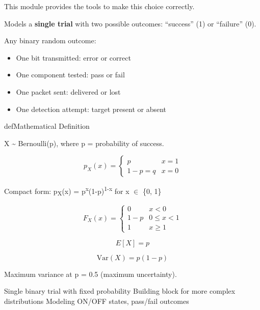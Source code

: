 This module provides the tools to make this choice correctly.



Models a \textbf{single trial} with two possible outcomes: ``success'' (1) or ``failure'' (0).


Any binary random outcome:

\begin{itemize}
\tightlist
\item
  One bit transmitted: error or correct
\item
  One component tested: pass or fail
\item
  One packet sent: delivered or lost
\item
  One detection attempt: target present or absent
\end{itemize}

\begin{PSbox}[unbreakable]{def}{Mathematical Definition}

X \textasciitilde{} Bernoulli(p), where p = probability of success.

\end{PSbox}


\[p_X(x) = \begin{cases} p & x = 1 \\ 1-p = q & x = 0 \end{cases}\]

Compact form: p\textsubscript{X}(x) = p\textsuperscript{x}(1-p)\textsuperscript{1-x} for x \ensuremath{\in} \{0, 1\}


\[F_X(x) = \begin{cases} 0 & x < 0 \\ 1-p & 0 \leq x < 1 \\ 1 & x \geq 1 \end{cases}\]


\[E[X] = p\]


\[\text{Var}(X) = p(1-p)\]

Maximum variance at p = 0.5 (maximum uncertainty).


\PSyes{} Single binary trial with fixed probability\PSbr{}\PSyes{} Building block for more complex distributions\PSbr{}\PSyes{} Modeling ON/OFF states, pass/fail outcomes

